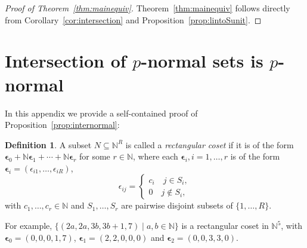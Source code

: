 \documentclass[letterpaper, 11pt, thm-restate]{article}
\numberwithin{equation}{section}
\newcommand{\N}{\mathbb{N}}
\newcommand{\bepsilon}{\boldsymbol{\epsilon}}
\theoremstyle{definition}
\newtheorem{defn}[thrm]{Definition}
\theoremstyle{definition}
\theoremstyle{definition}
\begin{document}
\begin{proof}[Proof of Theorem~\ref{thm:mainequiv}]
    Theorem~\ref{thm:mainequiv} follows directly from Corollary~\ref{cor:intersection} and Proposition~\ref{prop:lintoSunit}.
\end{proof}



\appendix
\section{Intersection of $p$-normal sets is $p$-normal}\label{app:internormal}
In this appendix we provide a self-contained proof of Proposition~\ref{prop:internormal}:

\propinternormal*

\begin{defn}\label{def:rectangular}
    A subset $N \subseteq \N^R$ is called a \emph{rectangular coset} if it is of the form $\bepsilon_0 + \N \bepsilon_1 + \cdots + \N \bepsilon_r$ for some $r \in \N$, where each $\bepsilon_i, i = 1, \ldots, r$ is of the form $\bepsilon_i = (\epsilon_{i1}, \ldots, \epsilon_{iR})$,
    \[
    \epsilon_{ij} =
    \begin{cases}
        c_i \quad j \in S_i, \\
        0 \quad j \notin S_i,
    \end{cases}
    \]
    with $c_1, \ldots, c_r \in \N$ and $S_1, \ldots, S_r$ are pairwise disjoint subsets of $\{1, \ldots, R\}$.
\end{defn}

For example, $\{(2a, 2a, 3b, 3b+1, 7) \mid a, b \in \N\}$ is a rectangular coset in $\N^5$, with $\bepsilon_0 = (0, 0, 0, 1, 7)$, $\bepsilon_1 = (2, 2, 0, 0, 0)$ and $\bepsilon_2 = (0, 0, 3, 3, 0)$.
\end{document}

